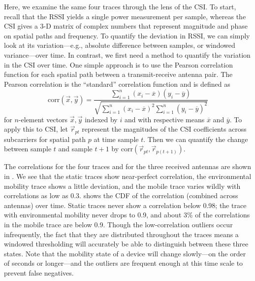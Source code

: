  Here, we examine the same four traces through the lens of the CSI\@. To start, recall that the RSSI yields a single power measurement per sample, whereas the CSI gives a 3-D matrix of complex numbers that represent magnitude and phase on spatial paths and frequency. To quantify the deviation in RSSI, we can simply look at its variation---e.g., absolute difference between samples, or windowed variance---over time. In contrast, we first need a method to quantify the variation in the CSI over time. One simple approach is to use the Pearson correlation function for each spatial path between a transmit-receive antenna pair. The Pearson correlation is the ``standard'' correlation function and is defined as
$$
\text{corr}(\vec{x},\vec{y}) = \frac{\sum_{i=1}^n(x_i-\overline{x})(y_i-\overline{y})}{\sqrt{\sum_{i=1}^n(x_i-\overline{x})^2 \sum_{i=1}^n(y_i-\overline{y})^2}}
$$
for $n$-element vectors $\vec{x},\vec{y}$ indexed by $i$ and with respective means $\overline{x}$ and $\overline{y}$. To apply this to CSI, let $\vec{r}_{pt}$ represent the magnitudes of the CSI coefficients across subcarriers for spatial path $p$ at time sample $t$. Then we can quantify the change between sample $t$ and sample $t+1$ by $\text{corr}(\vec{r}_{pt},\vec{r}_{p(t+1)})$.

The correlations for the four traces and for the three received antennas are shown in . We see that the static traces show near-perfect correlation, the environmental mobility trace shows a little deviation, and the mobile trace varies wildly with correlations as low as 0.3.  shows the CDF of the correlation (combined across antennas) over time. Static traces never show a correlation below 0.98; the trace with environmental mobility never drops to 0.9, and about 3\% of the correlations in the mobile trace are below 0.9. Though the low-correlation outliers occur infrequently, the fact that they are distributed throughout the traces means a windowed thresholding will accurately be able to distinguish between these three states. Note that the mobility state of a device will change slowly---on the order of seconds or longer---and the outliers are frequent enough at this time scale to prevent false negatives.


